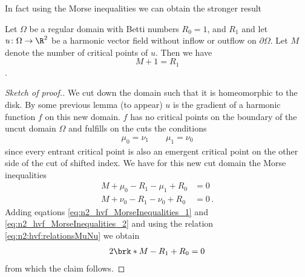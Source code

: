 In fact using the Morse inequalities we can obtain the stronger result
\begin{proposition}
  Let $\Omega$ be a regular domain with Betti numbers $R_0=1$, and $R_1$ and let $u\colon\Omega\to\R^2$ be 
  a harmonic vector field without inflow or outflow on $\partial\Omega$. Let $M$ denote the number of critical points of $u$.
  Then we have $$M+1=R_1$$.
\end{proposition}
\begin{proof}[Sketch of proof.]
  We cut down the domain such that it is homeomorphic to the disk. By some previous lemma (to appear)
   $u$ is the gradient of a harmonic function $f$ on this new domain.
  $f$ has no critical points on the boundary of the uncut domain $\Omega$ and fulfills on the cuts the conditions
  \begin{align}
    \mu_0=\nu_1 \qquad \mu_1=\nu_0 \label{eq:n2:hvf:relationsMuNu}
  \end{align}
  since every entrant critical point is also an emergent critical point on the other side of the cut of shifted index.
  We have for this new cut domain the Morse inequalities
  \begin{align}
    M+\mu_0-R_1-\mu_1+R_0&=0 \label{eq:n2_hvf_MorseInequalities_1}\\
    M+\nu_0-R_1-\nu_0+R_0&=0\,. \label{eq:n2_hvf_MorseInequalities_2}
  \end{align}
  Adding eqations \eqref{eq:n2_hvf_MorseInequalities_1} and \eqref{eq:n2_hvf_MorseInequalities_2} and using the relation
  \eqref{eq:n2:hvf:relationsMuNu} we obtain
  \begin{align*}
    2\brk*{M-R_1+R_0}=0
  \end{align*}
  from which the claim follows.
\end{proof}

